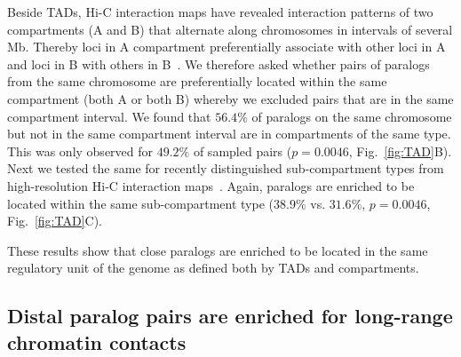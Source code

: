 \documentclass[a4paper,twoside=true,openright,parskip=full,chapterprefix=true,11pt,headings=normal,bibliography=totoc,listof=totoc,titlepage=on,captions=tableabove,draft=false]{scrreprt}
\theoremstyle{definition}
\theoremstyle{definition}
\theoremstyle{definition}
\theoremstyle{remark}
\begin{document}
Beside TADs, Hi-C interaction maps have revealed interaction patterns of
two compartments (A and B) that alternate along chromosomes in intervals
of several Mb. Thereby loci in A compartment preferentially associate
with other loci in A and loci in B with others in
B~\citep{Lieberman-Aiden2009, Rao2014, Dekker2013}. We therefore asked
whether pairs of paralogs from the same chromosome are preferentially
located within the same compartment (both A or both B) whereby we
excluded pairs that are in the same compartment interval. We found that
\(56.4\%\) of paralogs on the same chromosome but not in the same
compartment interval are in compartments of the same type. This was only
observed for \(49.2\%\) of sampled pairs (\(p=0.0046\),
Fig.~\ref{fig:TAD}B). Next we tested the same for recently distinguished
sub-compartment types from high-resolution Hi-C interaction
maps~\citep{Rao2014}. Again, paralogs are enriched to be located within
the same sub-compartment type (\(38.9\%\) vs. \(31.6\%\), \(p=0.0046\),
Fig.~\ref{fig:TAD}C).

These results show that close paralogs are enriched to be located in the
same regulatory unit of the genome as defined both by TADs and
compartments.

\hypertarget{distal-paralog-pairs-are-enriched-for-long-range-chromatin-contacts}{%
\subsection{Distal paralog pairs are enriched for long-range chromatin
contacts}\label{distal-paralog-pairs-are-enriched-for-long-range-chromatin-contacts}}
\end{document}
